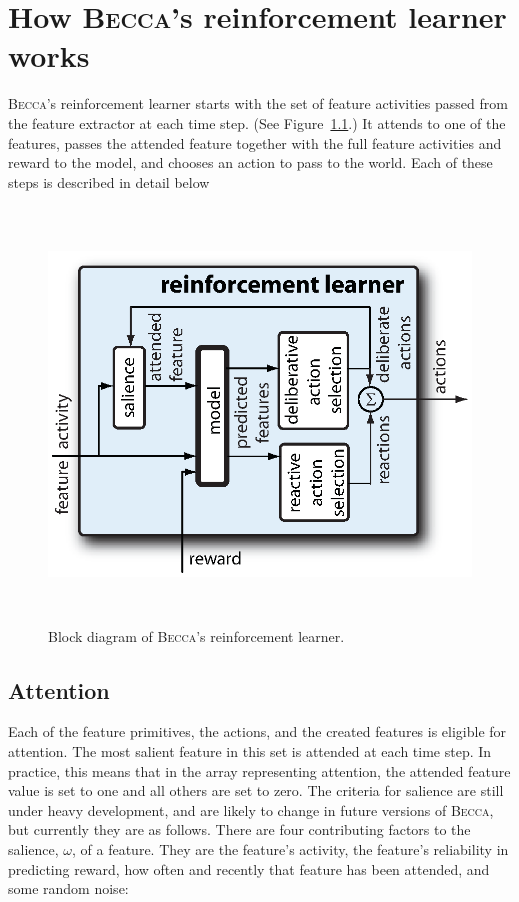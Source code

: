 \chapter{How \textsc{Becca}'s reinforcement learner works}
\label{actor_chapter}

\textsc{Becca}'s reinforcement learner starts with the set of feature activities passed from the feature extractor at each time step. (See Figure~\ref{becca_reinforcement_learner}.) It attends to one of the features, passes the attended feature together with the full feature activities and reward to the model, and chooses an action to pass to the world. Each of these steps is described in detail below  

\begin{figure}
\centering
\includegraphics[height=11cm]{figs/becca_reinforcement_learner.eps}
\caption{Block diagram of \textsc{Becca}'s reinforcement learner.}
\label{becca_reinforcement_learner}
\end{figure}

\section{Attention}
Each of the feature primitives, the actions, and the created features is eligible for attention. The most salient feature in this set is attended at each time step. In practice, this means that in the array representing attention, the attended feature value is set to one and all others are set to zero. The criteria for salience are still under heavy development, and are likely to change in future versions of \textsc{Becca}, but currently they are as follows. There are four contributing factors to the salience, $\omega$, of a feature. They are the feature's activity, the feature's reliability in predicting reward, how often and recently that feature has been attended, and some random noise:

